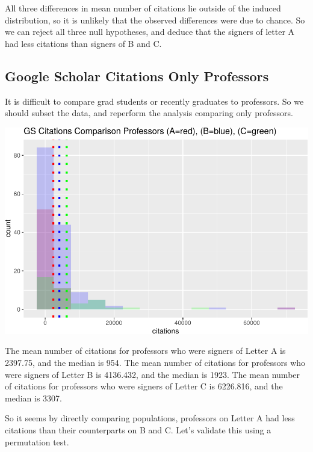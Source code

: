 \documentclass[]{article}
\begin{document}
All three differences in mean number of citations lie outside of the
induced distribution, so it is unlikely that the observed differences
were due to chance. So we can reject all three null hypotheses, and
deduce that the signers of letter A had less citations than signers of B
and C.

\hypertarget{google-scholar-citations-only-professors}{%
\subsection{Google Scholar Citations Only
Professors}\label{google-scholar-citations-only-professors}}

It is difficult to compare grad students or recently graduates to
professors. So we should subset the data, and reperform the analysis
comparing only professors.

\includegraphics{final_files/figure-latex/unnamed-chunk-62-1.pdf}

The mean number of citations for professors who were signers of Letter A
is 2397.75, and the median is 954. The mean number of citations for
professors who were signers of Letter B is 4136.432, and the median is
1923. The mean number of citations for professors who were signers of
Letter C is 6226.816, and the median is 3307.

So it seems by directly comparing populations, professors on Letter A
had less citations than their counterparts on B and C. Let's validate
this using a permutation test.
\end{document}
